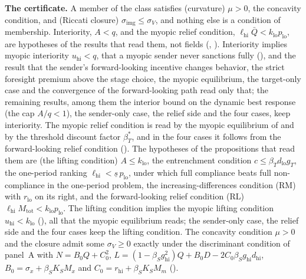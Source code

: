 \textbf{The certificate.} A member of the class satisfies (curvature) $\mu>0$,
the concavity condition, and (Riccati closure) $\sigma_{\mathrm{img}}\le\sigma_V$,
and nothing else is a condition of membership.
Interiority, $A<q$, and the myopic relief condition,
$\ell_{\mathrm{hi}}\bar Q<k_{\mathrm{lo}}p_{\mathrm{lo}}$, are hypotheses of the
results that read them, not fields (,
). Interiority implies myopic interiority $u_{\mathrm{hi}}<q$, that a myopic
sender never sanctions fully (), and the result that the
sender's forward-looking incentive changes behavior, the strict foresight premium above
the stage choice, the myopic equilibrium,
the target-only case and the convergence of the forward-looking path read
only that; the remaining results, among them the interior bound on the
dynamic best response (the cap $A/q<1$), the sender-only case, the relief
side and the four cases, keep interiority. The myopic relief condition is read by
the myopic equilibrium of  and by the threshold
discount factor $\beta_T^*$, and in the four cases it follows from the forward-looking
relief condition ().
The hypotheses of the propositions that read them are (the lifting condition)
$A\le k_{\mathrm{lo}}$, the entrenchment condition $c\le\beta_Td_{\mathrm{lo}}g_T$, the
one-period ranking $\ell_{\mathrm{hi}}<\underline s\,p_{\mathrm{lo}}$, under which
full compliance beats full non-compliance in the one-period problem, the increasing-differences condition (RM)
with $r_{\mathrm{lo}}$ on its right, and the forward-looking relief condition (RL)
$\ell_{\mathrm{hi}}M_{\mathrm{tot}}<k_{\mathrm{lo}}p_{\mathrm{lo}}$. The lifting condition implies the myopic
lifting condition $u_{\mathrm{hi}}<k_{\mathrm{lo}}$ (), all that the myopic
equilibrium reads; the sender-only case, the relief side and the four cases
keep the lifting condition. The concavity
condition $\mu>0$ and the closure admit some $\sigma_V\ge0$ exactly under the discriminant
condition of panel~A with $N=B_0Q+C_0^2$,
$L=(1-\beta_Sg_{\mathrm{hi}}^2)Q+B_0D-2C_0\beta_Sg_{\mathrm{hi}}d_{\mathrm{hi}}$,
$B_0=\sigma_x+\beta_SK_SM_x$ and $C_0=r_{\mathrm{hi}}+\beta_SK_SM_m$
().

